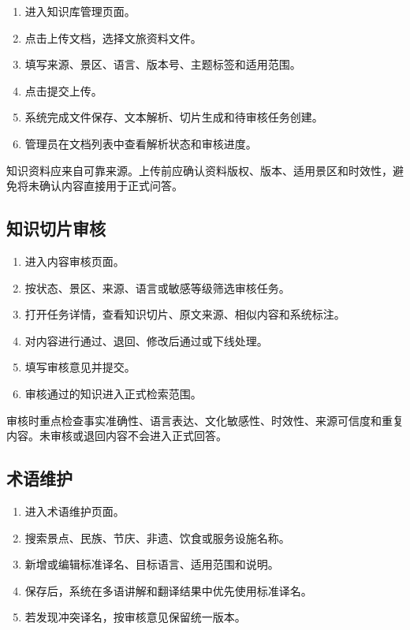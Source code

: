 \begin{enumerate}[leftmargin=2em]
  \item 进入知识库管理页面。
  \item 点击上传文档，选择文旅资料文件。
  \item 填写来源、景区、语言、版本号、主题标签和适用范围。
  \item 点击提交上传。
  \item 系统完成文件保存、文本解析、切片生成和待审核任务创建。
  \item 管理员在文档列表中查看解析状态和审核进度。
\end{enumerate}

知识资料应来自可靠来源。上传前应确认资料版权、版本、适用景区和时效性，避免将未确认内容直接用于正式问答。


\subsection{知识切片审核}

\begin{enumerate}[leftmargin=2em]
  \item 进入内容审核页面。
  \item 按状态、景区、来源、语言或敏感等级筛选审核任务。
  \item 打开任务详情，查看知识切片、原文来源、相似内容和系统标注。
  \item 对内容进行通过、退回、修改后通过或下线处理。
  \item 填写审核意见并提交。
  \item 审核通过的知识进入正式检索范围。
\end{enumerate}

审核时重点检查事实准确性、语言表达、文化敏感性、时效性、来源可信度和重复内容。未审核或退回内容不会进入正式回答。


\subsection{术语维护}

\begin{enumerate}[leftmargin=2em]
  \item 进入术语维护页面。
  \item 搜索景点、民族、节庆、非遗、饮食或服务设施名称。
  \item 新增或编辑标准译名、目标语言、适用范围和说明。
  \item 保存后，系统在多语讲解和翻译结果中优先使用标准译名。
  \item 若发现冲突译名，按审核意见保留统一版本。
\end{enumerate}

